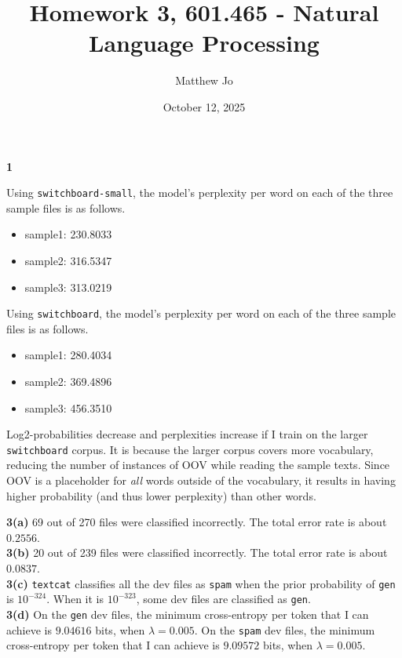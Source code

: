\documentclass{article}
\title{Homework 3, 601.465 - Natural Language Processing}
\author{Matthew Jo}
\date{October 12, 2025}
\begin{document}
\maketitle

\textbf{1}

Using \texttt{switchboard-small}, the model's perplexity per word on each of the three sample files is as follows.
\begin{itemize}
	\item sample1: 230.8033
	\item sample2: 316.5347
	\item sample3: 313.0219
\end{itemize}

Using \texttt{switchboard}, the model's perplexity per word on each of the three sample files is as follows.
\begin{itemize}
	\item sample1: 280.4034
	\item sample2: 369.4896
	\item sample3: 456.3510
\end{itemize}

Log2-probabilities decrease and perplexities increase if I train on the larger \texttt{switchboard} corpus. It is because the larger corpus covers more vocabulary, reducing the number of instances of OOV while reading the sample texts. Since OOV is a placeholder for \textit{all} words outside of the vocabulary, it results in having higher probability (and thus lower perplexity) than other words.

\pagebreak

\textbf{3(a)} 69 out of 270 files were classified incorrectly. The total error rate is about $0.2556$. \\

\textbf{3(b)} 20 out of 239 files were classified incorrectly. The total error rate is about $0.0837$. \\

\textbf{3(c)} \texttt{textcat} classifies all the dev files as \texttt{spam} when the prior probability of \texttt{gen} is $10^{-324}$. When it is $10^{-323}$, some dev files are classified as \texttt{gen}. \\

\textbf{3(d)} On the \texttt{gen} dev files, the minimum cross-entropy per token that I can achieve is $9.04616$ bits, when $\lambda = 0.005$. On the \texttt{spam} dev files, the minimum cross-entropy per token that I can achieve is $9.09572$ bits, when $\lambda = 0.005$. \\
\end{document}

